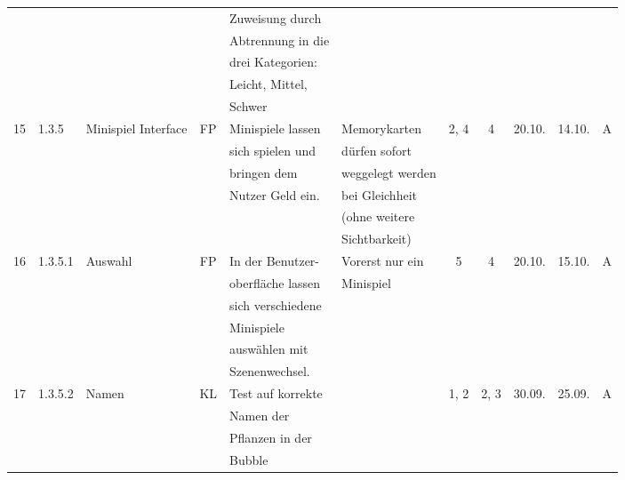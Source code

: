 \begin{longtable}{|c|l|l|c|l|l|c|c|c|c|c|}
            &       &            &    & Zuweisung durch &   &   & & & &\\
            &       &            &    & Abtrennung in die &   &   & & & &\\
            &       &            &    & drei Kategorien: &   &   & & & &\\
            &       &            &    & Leicht, Mittel, &   &   & & & &\\
            &       &            &    & Schwer &   &   & & & &\\
            \hline
            15 & 1.3.5 & Minispiel Interface & FP & Minispiele lassen & Memorykarten & 2, 4 & 4 & 20.10. & 14.10. & A \\
            &       &            &    & sich spielen und & dürfen sofort  &   & & & &\\
            &       &            &    & bringen dem & weggelegt werden  &   & & & &\\
            &       &            &    & Nutzer Geld ein. & bei Gleichheit  &   & & & &\\
            &       &            &    &  &  (ohne weitere &   & & & &\\
            &       &            &    &  & Sichtbarkeit)  &   & & & &\\
            \hline
            16 & 1.3.5.1 & Auswahl & FP & In der Benutzer- & Vorerst nur ein & 5 & 4 & 20.10. & 15.10. & A \\
            &       &            &    & oberfläche lassen &  Minispiel &   & & & &\\
            &       &            &    & sich verschiedene &   &   & & & &\\
            &       &            &    & Minispiele &   &   & & & &\\
            &       &            &    & auswählen mit &   &   & & & &\\
            &       &            &    & Szenenwechsel. &   &   & & & &\\
            \hline
            17 & 1.3.5.2 & Namen & KL & Test auf korrekte &  & 1, 2 & 2, 3 & 30.09. & 25.09. & A \\
            &       &            &    & Namen der &   &   & & & &\\
            &       &            &    & Pflanzen in der &   &   & & & &\\
            &       &            &    & Bubble &   &   & & & &\\
            \hline

\end{longtable}
